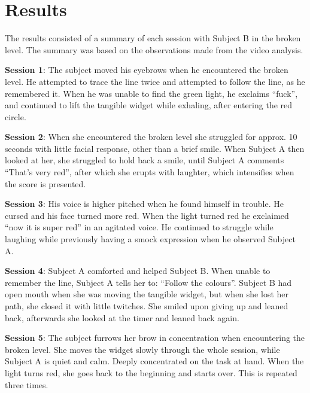 \section{Results}
The results consisted of a summary of each session with Subject B in the broken level. The summary was based on the observations made from the video analysis.

\textbf{Session 1}: The subject moved his eyebrows when he encountered the broken level. He attempted to trace the line twice and attempted to follow the line, as he remembered it. When he was unable to find the green light, he exclaims “fuck”, and continued to lift the tangible widget while exhaling, after entering the red circle.

\textbf{Session 2}: When she encountered the broken level she struggled for approx. 10 seconds with little facial response, other than a brief smile. When Subject A then looked at her, she struggled to hold back a smile, until Subject A comments “That’s very red”, after which she erupts with laughter, which intensifies when the score is presented.

\textbf{Session 3}: His voice is higher pitched when he found himself in trouble. He cursed and his face turned more red. When the light turned red he exclaimed “now it is super red” in an agitated voice. He continued to struggle while laughing while previously having a smock expression when he observed Subject A.

\textbf{Session 4}: Subject A comforted and helped Subject B. When unable to remember the line, Subject A tells her to: “Follow the colours”. Subject B had open mouth when she was  moving the tangible widget, but when she lost her path, she closed it with little twitches. She smiled upon giving up and leaned back, afterwards she looked at the timer and leaned back again.

\textbf{Session 5}: The subject furrows her brow in concentration when encountering the broken level. She moves the widget slowly through the whole session, while Subject A is quiet and calm. Deeply concentrated on the task at hand. When the light turns red, she goes back to the beginning and starts over. This is repeated three times.
